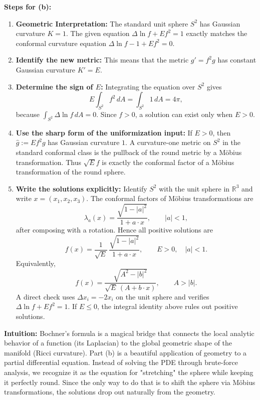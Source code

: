 \begin{solution}
\medskip
\textbf{Steps for (b):}
\begin{enumerate}
    \item \textbf{Geometric Interpretation:} The standard unit sphere $S^2$ has Gaussian curvature $K = 1$. The given equation $\Delta \ln f + E f^2 = 1$ exactly matches the conformal curvature equation $\Delta \ln f - 1 + E f^2 = 0$.
    \item \textbf{Identify the new metric:} This means that the metric $g' = f^2 g$ has constant Gaussian curvature $K' = E$.
    \item \textbf{Determine the sign of $E$:} Integrating the equation over $S^2$ gives
    \[
        E\int_{S^2} f^2\,dA=\int_{S^2}1\,dA=4\pi,
    \]
    because $\int_{S^2}\Delta\ln f\,dA=0$. Since $f>0$, a solution can exist only
    when $E>0$.
    \item \textbf{Use the sharp form of the uniformization input:} If $E>0$, then
    $\widehat g:=E f^2 g$ has Gaussian curvature $1$. A curvature-one metric on
    $S^2$ in the standard conformal class is the pullback of the round metric by a
    M\"obius transformation. Thus $\sqrt{E}f$ is exactly the conformal factor of a
    M\"obius transformation of the round sphere.
    \item \textbf{Write the solutions explicitly:} Identify $S^2$ with the unit
    sphere in $\mathbb{R}^3$ and write $x=(x_1,x_2,x_3)$. The conformal factors of
    M\"obius transformations are
    \[
        \lambda_a(x)=\frac{\sqrt{1-|a|^2}}{1+a\cdot x},
        \qquad |a|<1,
    \]
    after composing with a rotation. Hence all positive solutions are
    \[
        f(x)=\frac{1}{\sqrt{E}}\,
        \frac{\sqrt{1-|a|^2}}{1+a\cdot x},
        \qquad E>0,\quad |a|<1.
    \]
    Equivalently,
    \[
        f(x)=\frac{\sqrt{A^2-|b|^2}}{\sqrt{E}\,(A+b\cdot x)},
        \qquad A>|b|.
    \]
    A direct check uses $\Delta x_i=-2x_i$ on the unit sphere and verifies
    $\Delta\ln f+Ef^2=1$. If $E\leq 0$, the integral identity above rules out
    positive solutions.
\end{enumerate}

\medskip
\textbf{Intuition:}
Bochner's formula is a magical bridge that connects the local analytic behavior of a function (its Laplacian) to the global geometric shape of the manifold (Ricci curvature). 
Part (b) is a beautiful application of geometry to a partial differential equation. Instead of solving the PDE through brute-force analysis, we recognize it as the equation for "stretching" the sphere while keeping it perfectly round. Since the only way to do that is to shift the sphere via M\"obius transformations, the solutions drop out naturally from the geometry.
\end{solution}


